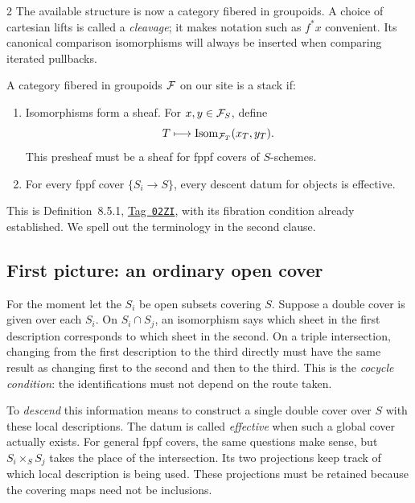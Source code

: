 \documentclass[12pt]{memoir}
\newcommand{\BGtag}[1]{\href{https://stacks.math.columbia.edu/tag/#1}{Tag~\texttt{#1}}}
\begin{document}
\begin{multicols}{2}
The available structure is now a category fibered in groupoids. A choice
of cartesian lifts is called a \emph{cleavage}; it makes notation such as
$f^*x$ convenient. Its canonical comparison isomorphisms will always be
inserted when comparing iterated pullbacks.

\begin{Def}\label{def:stack}
A category fibered in groupoids $\mathcal{F}$ on our site is a stack if:
\begin{enumerate}[label=(\arabic*)]
\item Isomorphisms form a sheaf. For $x,y\in\mathcal{F}_S$, define
\[
 T\longmapsto\operatorname{Isom}_{\mathcal{F}_T}(x_T,y_T).
\]
This presheaf must be a sheaf for fppf covers of $S$-schemes.
\item For every fppf cover $\{S_i\to S\}$, every descent datum for
objects is effective.
\end{enumerate}
\end{Def}
This is Definition~8.5.1, \BGtag{02ZI}, with its fibration condition
already established. We spell out the terminology in the second clause.

\subsection{First picture: an ordinary open cover}
For the moment let the $S_i$ be open subsets covering $S$. Suppose a
double cover is given over each $S_i$. On $S_i\cap S_j$, an
isomorphism says which sheet in the first description corresponds to
which sheet in the second. On a triple intersection, changing from the
first description to the third directly must have the same result as
changing first to the second and then to the third. This is the
\emph{cocycle condition}: the identifications must not depend on the
route taken.

To \emph{descend} this information means to construct a single double
cover over $S$ with these local descriptions. The datum is called
\emph{effective} when such a global cover actually exists. For general
fppf covers, the same questions make sense, but $S_i\times_S S_j$
takes the place of the intersection. Its two projections keep track
of which local description is being used. These projections must be
retained because the covering maps need not be inclusions.


\end{multicols}
\end{document}
